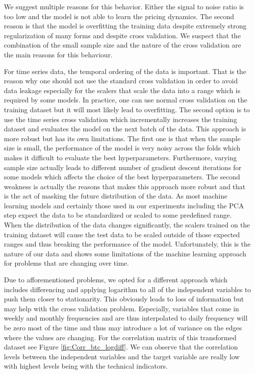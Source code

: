 We suggest multiple reasons for this behavior. 
Either the signal to noise ratio is too low
and the model is not able 
to learn the pricing dynamics. 
The second reason is that the model is overfitting the training
data despite extremely strong regularization of many forms and despite
cross validation. We suspect
that the combination of the small sample size and the
nature of the cross validation 
are the main reasons for this behaviour. 

For time series data, the temporal ordering of the data is important.
That is the reason why one should not use the standard cross validation
in order to avoid data leakage especially 
for the scalers that scale the data into a range
which is required by some models. In practice, 
one can use normal cross validation on the training dataset
but it will most likely lead to overfitting.
The second option is to use the time series cross validation
which incrementally increases the training dataset 
and evaluates the model on the next batch of the data.
This approach is more robust but has its own limitations.
The first one is that when the sample size is small, 
the performance of the model is very noisy across the folds
which makes it difficult to evaluate the best hyperparameters. 
Furthermore, varying sample size actually 
leads to different number of gradient descent iterations
for some models which affects the choice of the best hyperparameters.
The second weakness is actually the reasons
that makes this approach more robust and that is the
act of masking the future distribution of the data.
As most machine learning models and certainly 
those used in our experiments including the \ac{PCA} step
expect the data to be standardized
or scaled to some predefined range.
When the distribution of the data changes
significantly, the scalers trained on the training dataset
will cause the test data to be scaled
outside of those expected ranges and thus breaking the 
performance of the model. 
Unfortunately,
this is the nature of our data 
and shows some limitations of the machine learning approach 
for problems that are changing over time.


Due to afforementioned problems, we opted for a different approach
which includes differencing and applying logarithm to all of
the independent variables to push them closer to stationarity.
This obviously leads to loss of information 
but may help with the cross validation problem.
Especially, variables that come in weekly and monthly frequencies
and are thus interpolated to daily frequency
will be zero most of the time and thus
may introduce a lot of variance on the edges where the values
are changing. For the correlation matrix of this transformed 
dataset see Figure \ref{fig:Corr_btc_logdiff}. We can 
observe that the correlation levels between the independent variables
and the target variable are really low with highest 
levels being with the technical indicators.

